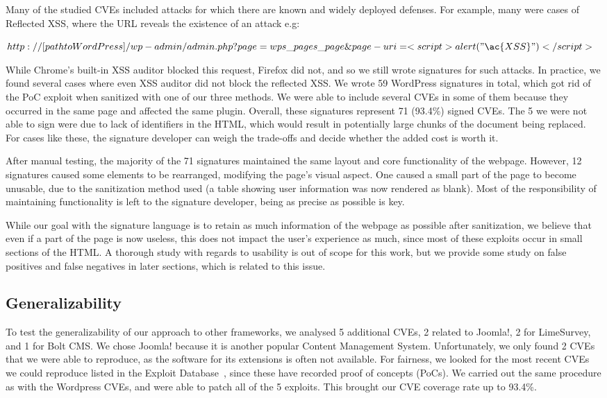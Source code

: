 Many of the studied CVEs included attacks for which there are known and widely deployed defenses. For example, many were cases of Reflected \ac{XSS}, where the URL reveals the existence of an attack e.g:


$http://[path to WordPress]/wp-admin/admin.php?page=wps\_pages\_page\&page-uri=<script>alert("\ac{XSS}")</script>$

While Chrome's built-in \ac{XSS} auditor blocked this request, Firefox did not, and so we still wrote signatures for such attacks. In practice, we found several cases where even XSS auditor did not block the reflected XSS. We wrote 59 WordPress signatures in total, which got rid of the PoC exploit when sanitized with one of our three methods. We were able to include several CVEs in some of them because they occurred in the same page and affected the same plugin. Overall, these signatures represent 71 (93.4\%) signed CVEs. The 5 we were not able to sign were due to lack of identifiers in the HTML, which would result in potentially large chunks of the document being replaced. For cases like these, the signature developer can weigh the trade-offs and decide whether the added cost is worth it.

After manual testing, the majority of the 71 signatures maintained the same layout and core functionality of the webpage. However, 12 signatures caused some elements to be rearranged, modifying the page's visual aspect. One caused a small part of the page to become unusable, due to the sanitization method used (a table showing user information was now rendered as blank). Most of the responsibility of maintaining functionality is left to the signature developer, being as precise as possible is key.

While our goal with the signature language is to retain as much information of the webpage as possible after sanitization, we believe that even if a part of the page is now useless, this does not impact the user's experience as much, since most of these exploits occur in small sections of the HTML. A thorough study with regards to usability is out of scope for this work, but we provide some study on false positives and false negatives in later sections, which is related to this issue.

\subsection{Generalizability} \label{generalizability}

To test the generalizability of our approach to other frameworks, we
analysed 5 additional CVEs, 2 related to Joomla!, 2 for LimeSurvey,
and 1 for Bolt CMS.  We chose Joomla! because it is another 
popular Content Management System. Unfortunately, we only found 2 CVEs
that we were able to reproduce, as the software for its extensions is
often not available. For fairness, we looked for the most recent CVEs
we could reproduce listed in the Exploit Database~\cite{exploitdb}, since
these have recorded proof of concepts (PoCs). We carried out the same
procedure as with the Wordpress CVEs, and were able to patch all of
the 5 exploits. This brought our CVE coverage rate up to 93.4\%.


